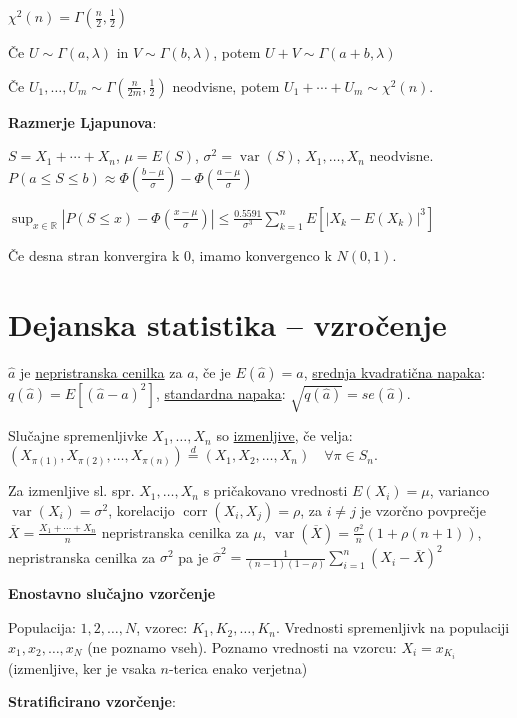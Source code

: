 \documentclass[11pt,a4paper]{amsart}
\theoremstyle{definition} %
\theoremstyle{plain} %
\newcommand{\R}{\mathbb R}
\DeclareMathOperator{\var}{var}
\DeclareMathOperator{\corr}{corr}
\begin{document}
$\chi^2(n) = \Gamma(\frac{n}{2}, \frac{1}{2})$

Če $U \sim \Gamma(a,\lambda)$ in $V \sim \Gamma(b, \lambda)$, potem $U+V \sim
\Gamma (a+b, \lambda)$

Če $U_1,\ldots , U_m \sim \Gamma(\frac{n}{2m},\frac{1}{2})$ neodvisne, potem
$U_1 + \cdots + U_m \sim \chi^2 (n)$.

\textbf{Razmerje Ljapunova}:

$S= X_1+\cdots + X_n$, $\mu = E(S)$, $\sigma^2 = \var(S)$, $X_1,\ldots , X_n$
neodvisne.  $P(a \leq S \leq b) \approx \Phi(\frac{b-\mu}{\sigma}) - \Phi
(\frac{a-\mu}{\sigma})$

$\sup_{x\in \R} |P(S\leq x) - \Phi (\frac{x-\mu}{\sigma})| \leq
\frac{0.5591}{\sigma^3} \sum_{k=1}^n E[|X_k - E(X_k)|^3]$

Če desna stran konvergira k 0, imamo konvergenco k $N(0,1)$.

\section*{Dejanska statistika -- vzročenje}

$\widehat{a}$ je \underline{nepristranska cenilka} za $a$, če je $E(\widehat{a}) = a$,
\underline{srednja kvadratična napaka}: $q(\widehat{a}) = E[(\widehat{a}-a)^2]$,
\underline{standardna napaka}: $\sqrt{q(\widehat{a})} = se(\widehat{a})$.

Slučajne spremenljivke $X_1,\ldots ,X_n$ so \underline{izmenljive}, če velja:
$(X_{\pi(1)},X_{\pi(2)},\ldots, X_{\pi(n)}) \stackrel{d}{=} (X_1,X_2,\ldots,X_n)
\quad \forall \pi \in S_n.$

Za izmenljive sl. spr. $X_1,\ldots ,X_n$ s pričakovano vrednosti $E(X_i) = \mu$,
varianco $\var(X_i) = \sigma^2$, korelacijo $\corr(X_i, X_j) = \rho$, za $i \neq
j$ je vzorčno povprečje $\overline{X} = \frac{X_1 + \cdots + X_n}{n}$ nepristranska
cenilka za $\mu$,  $\var(\overline{X}) = \frac{\sigma^2}{n}(1+\rho(n+1))$,
nepristranska cenilka za $\sigma^2$ pa je $\hat{\sigma}^2 =
\frac{1}{(n-1)(1-\rho)}\sum_{i=1}^n (X_i - \overline{X})^2 $

\textbf{Enostavno slučajno vzorčenje}

Populacija: $1,2,\ldots , N$, vzorec: $K_1, K_2, \ldots, K_n$. Vrednosti
spremenljivk na populaciji $x_1, x_2, \ldots, x_N$ (ne poznamo vseh). Poznamo
vrednosti na vzorcu: $X_i = x_{K_i}$ (izmenljive, ker je vsaka $n$-terica enako
verjetna)

\textbf{Stratificirano vzorčenje}:
\end{document}
